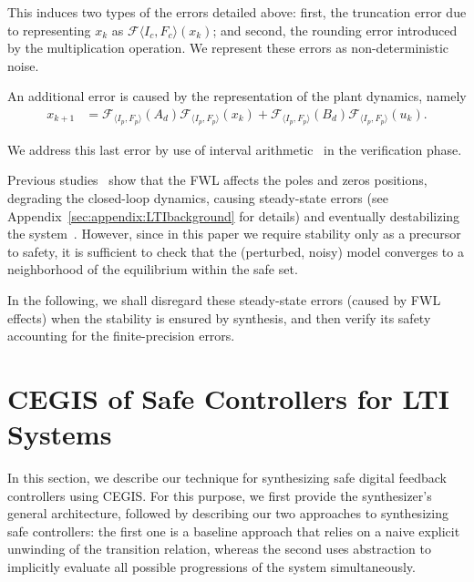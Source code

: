 \documentclass[runningheads,a4paper]{llncs}
\begin{document}
This induces two types of the errors detailed above: first, the truncation
error due to representing $x_k$ as $\mathcal{F}{\langle I_c,F_c
\rangle}(x_{k})$; and second, the rounding error introduced by the
multiplication operation.  We represent these errors as non-deterministic
noise.

An additional error is caused by the representation of the plant dynamics, namely 
%
\begin{align*}
x_{k+1} &=\mathcal{F}_{\langle I_p,F_p \rangle}(A_d) \mathcal{F}_{\langle I_p,F_p \rangle}(x_{k}) + \mathcal{F}_{\langle I_p,F_p \rangle}(B_d)\mathcal{F}_{\langle I_p,F_p \rangle}(u_{k}).
\end{align*}

We address this last error by use of interval
arithmetic~\cite{moore1966interval} in the verification phase.

Previous studies~\cite{gangli1} show that the FWL affects the poles and
zeros positions, degrading the closed-loop dynamics, causing steady-state
errors (see Appendix~\ref{sec:appendix:LTIbackground} for details) and
eventually destabilizing the system~\cite{Bessa16}.  However, since in this
paper we require stability only as a precursor to safety, it is sufficient
to check that the (perturbed, noisy) model converges to a neighborhood of
the equilibrium within the safe set.

In the following, we shall disregard these steady-state errors (caused by
FWL effects) when the stability is ensured by synthesis, and then verify its
safety accounting for the finite-precision errors.

\section{CEGIS of Safe Controllers for LTI Systems} 
\label{sec:CEGARIS} 

In this section, we describe our technique for synthesizing safe digital
feedback controllers using CEGIS.  For this purpose, we first provide the
synthesizer's general architecture, followed by describing our two
approaches to synthesizing safe controllers: the first one is a baseline
approach that relies on a naive explicit unwinding of the transition
relation, whereas the second uses abstraction to implicitly evaluate all
possible progressions of the system simultaneously.
\end{document}

